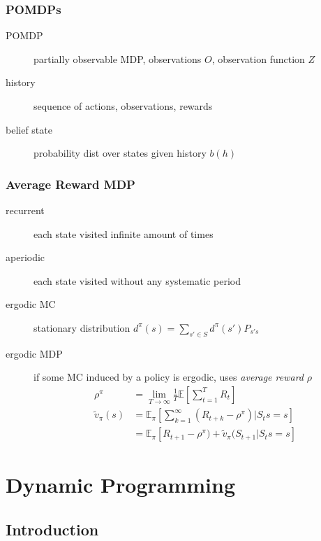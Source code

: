\documentclass[]{article}
\theoremstyle{definition}
\newcommand{\E}{\mathbb{E}}
\begin{document}
\subsubsection{POMDPs}
\label{ssub:pomdps}

\begin{description}
    \item[POMDP] partially observable MDP, observations $O$, observation function $Z$
    \item[history] sequence of actions, observations, rewards
    \item [belief state] probability dist over states given history $b(h)$
\end{description}

\subsubsection{Average Reward MDP}
\label{ssub:average_reward_mdp}

\begin{description}
    \item [recurrent] each state visited infinite amount of times
    \item [aperiodic] each state visited without any systematic period
    \item [ergodic MC] stationary distribution $d^\pi(s) = \sum_{s' \in S} d^\pi(s')P_{s's}$
    \item [ergodic MDP] if some MC induced by a policy is ergodic, uses \textit{average reward} $\rho$ \\
        \begin{align*}
            \rho^\pi &= \lim_{T \to \infty} \frac{1}{T} \E [\sum_{t=1}^T R_t] \\
            \tilde v_\pi(s) &= \E_\pi [\sum_{k=1}^\infty (R_{t+k} - \rho^\pi) | S_ts = s] \\
                            &= \E_\pi [R_{t+1} - \rho^\pi)  + \tilde v_\pi(S_{t+1}| S_ts = s]
        \end{align*}
\end{description}


\section{Dynamic Programming}
\label{sec:dynamic_programming}

\subsection{Introduction}
\label{sub:introduction}
\end{document}
